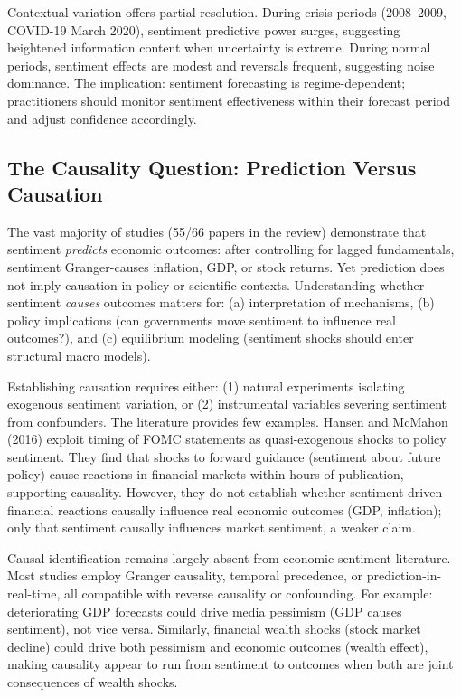\documentclass[11pt]{article}
\begin{document}
Contextual variation offers partial resolution. During crisis periods (2008--2009, COVID-19 March 2020), sentiment predictive power surges, suggesting heightened information content when uncertainty is extreme. During normal periods, sentiment effects are modest and reversals frequent, suggesting noise dominance. The implication: sentiment forecasting is regime-dependent; practitioners should monitor sentiment effectiveness within their forecast period and adjust confidence accordingly.

\subsection{The Causality Question: Prediction Versus Causation}

The vast majority of studies (55/66 papers in the review) demonstrate that sentiment \emph{predicts} economic outcomes: after controlling for lagged fundamentals, sentiment Granger-causes inflation, GDP, or stock returns. Yet prediction does not imply causation in policy or scientific contexts. Understanding whether sentiment \emph{causes} outcomes matters for: (a) interpretation of mechanisms, (b) policy implications (can governments move sentiment to influence real outcomes?), and (c) equilibrium modeling (sentiment shocks should enter structural macro models).

Establishing causation requires either: (1) natural experiments isolating exogenous sentiment variation, or (2) instrumental variables severing sentiment from confounders. The literature provides few examples. Hansen and McMahon (2016) exploit timing of FOMC statements as quasi-exogenous shocks to policy sentiment. They find that shocks to forward guidance (sentiment about future policy) cause reactions in financial markets within hours of publication, supporting causality. However, they do not establish whether sentiment-driven financial reactions causally influence real economic outcomes (GDP, inflation); only that sentiment causally influences market sentiment, a weaker claim.

Causal identification remains largely absent from economic sentiment literature. Most studies employ Granger causality, temporal precedence, or prediction-in-real-time, all compatible with reverse causality or confounding. For example: deteriorating GDP forecasts could drive media pessimism (GDP causes sentiment), not vice versa. Similarly, financial wealth shocks (stock market decline) could drive both pessimism and economic outcomes (wealth effect), making causality appear to run from sentiment to outcomes when both are joint consequences of wealth shocks.
\end{document}

